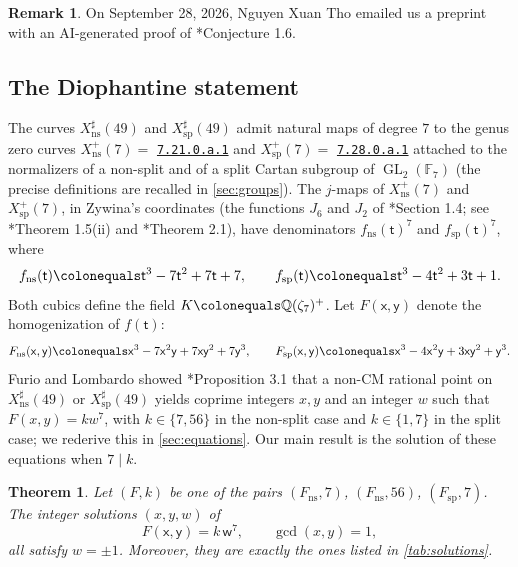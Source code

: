 \documentclass[12pt]{amsart}
\newcommand{\F}{{\mathbb F}}
\newcommand{\Q}{\mathbb{Q}}
\newcommand{\x}{\mathsf{x}}
\newcommand{\y}{\mathsf{y}}
\newcommand{\w}{\mathsf{w}}
\renewcommand{\t}{\mathsf{t}}
\DeclareMathOperator{\ns}{ns}
\DeclareMathOperator{\spc}{sp}
\newcommand{\GL}{\operatorname{GL}}
\newcommand{\mclabel}[1]{\href{https://beta.lmfdb.org/ModularCurve/Q/#1}{\texttt{#1}}}
\numberwithin{equation}{section}
\newtheorem{mainthm}{Theorem}
\theoremstyle{definition}
\newtheorem{remark}[theorem]{Remark}
\begin{document}
\begin{remark}
  On September 28, 2026, Nguyen Xuan Tho emailed us a preprint
  \cite{Xuan2026} with an AI-generated proof of
  \cite{Furio--Lombardo26}*{Conjecture
    1.6}.
\end{remark}

\subsection*{The Diophantine statement}
The curves $X_{\ns}^{\sharp}(49)$ and $X_{\spc}^{\sharp}(49)$ admit natural maps
of degree $7$ to the genus zero curves $X_{\ns}^{+}(7) =$ \mclabel{7.21.0.a.1} and
$X_{\spc}^{+}(7) =$ \mclabel{7.28.0.a.1} attached to the normalizers of a
non-split and of a split Cartan subgroup of $\GL_2(\F_7)$ (the precise
definitions are recalled in \cref{sec:groups}). The $j$-maps of
$X_{\ns}^{+}(7)$ and $X_{\spc}^{+}(7)$, in Zywina's coordinates (the functions
$J_6$ and $J_2$ of \cite{Zywina-15}*{Section 1.4}; see
\cite{Zywina-15}*{Theorem 1.5(ii)} and \cite{Furio--Lombardo26}*{Theorem 2.1}),
have denominators $f_{\ns}(\t)^7$ and $f_{\spc}(\t)^7$, where
\begin{equation}
  \label{eq:the-cubics}
  f_{\ns}(\t) \colonequals \t^3 - 7\t^2 + 7\t + 7,
  \qquad
  f_{\spc}(\t) \colonequals \t^3 - 4\t^2 + 3\t + 1 .
\end{equation}
Both cubics define the field $K \colonequals \Q(\zeta_7)^{+}$. Let $F(\x,\y)$
denote the homogenization of $f(\t)$:
\begin{equation}
  \label{eq:the-cubic-forms}
  F_{\ns}(\x,\y) \colonequals \x^3 - 7\x^2\y + 7\x\y^2 + 7\y^3,
  \qquad
  F_{\spc}(\x,\y) \colonequals \x^3 - 4\x^2\y + 3\x\y^2 + \y^3 .
\end{equation}
Furio and Lombardo showed
\cite{Furio--Lombardo26}*{Proposition 3.1} that a non-CM rational point on
$X_{\ns}^{\sharp}(49)$ or $X_{\spc}^{\sharp}(49)$ yields coprime integers $x,y$
and an integer $w$ such that $F(x,y) = k w^7$, with $k \in \{7,56\}$ in the
non-split case and $k \in \{1,7\}$ in the split case; we rederive this in
\cref{sec:equations}. Our main result is the solution of these equations when
$7 \mid k$.

\begin{mainthm}
  \label{thm:superelliptic}
  Let $(F,k)$ be one of the pairs $(F_{\ns},7)$, $(F_{\ns},56)$,
  $(F_{\spc},7)$. The integer solutions $(x,y,w)$ of
  \begin{equation}
    \label{eq:superelliptic-intro}
    F(\x,\y) = k\,\w^{7}, \qquad \gcd(x,y) = 1,
  \end{equation}
  all satisfy $w = \pm 1$. Moreover, they are exactly the ones listed in
  \cref{tab:solutions}.
\end{mainthm}
\end{document}
